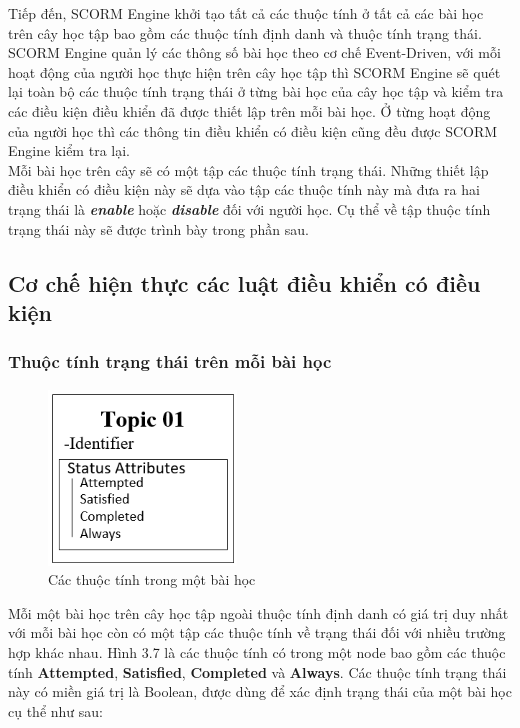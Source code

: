 	Tiếp đến, SCORM Engine khởi tạo tất cả các thuộc tính ở tất cả các bài học trên cây học tập bao gồm các thuộc tính định danh và thuộc tính trạng thái. SCORM Engine quản lý các thông số bài học theo cơ chế Event-Driven, với mỗi hoạt động của người học thực hiện trên cây học tập thì SCORM Engine sẽ quét lại toàn bộ các thuộc tính trạng thái ở từng bài học của cây học tập và kiểm tra các điều kiện điều khiển đã được thiết lập trên mỗi bài học. Ở từng hoạt động của người học thì các thông tin điều khiển có điều kiện cũng đều được SCORM Engine kiểm tra lại.\\
	
	Mỗi bài học trên cây sẽ có một tập các thuộc tính trạng thái. Những thiết lập điều khiển có điều kiện này sẽ dựa vào tập các thuộc tính này mà đưa ra hai trạng thái là \textbf{\textit{enable}} hoặc \textbf{\textit{disable}} đối với người học. Cụ thể về tập thuộc tính trạng thái này sẽ được trình bày trong phần sau.



\subsection{Cơ chế hiện thực các luật điều khiển có điều kiện}

\subsubsection{Thuộc tính trạng thái trên mỗi bài học}

\begin{center}
	\begin{figure}[htp]
		\begin{center}
			\includegraphics[width=5cm]{Chapter3/Pictures/picture37.png}
		\end{center}
		\caption{Các thuộc tính trong một bài học}
		\label{refpicture48}
	\end{figure}
\end{center}


Mỗi một bài học trên cây học tập ngoài thuộc tính định danh có giá trị duy nhất với mỗi bài học còn có một tập các thuộc tính về trạng thái đối với nhiều trường hợp khác nhau. Hình 3.7 là các thuộc tính có trong một node bao gồm các thuộc tính \textbf{Attempted}, \textbf{Satisfied}, \textbf{Completed} và \textbf{Always}. Các thuộc tính trạng thái này có miền giá trị là Boolean, được dùng để xác định trạng thái của một bài học cụ thể như sau:

